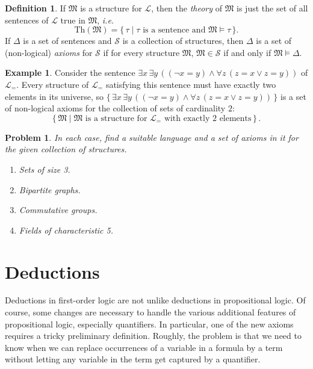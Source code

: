 \documentclass[12pt]{amsbook}
\theoremstyle{plain}
\newtheorem{prob}[thm]{Problem}
\theoremstyle{definition}
\newtheorem{defn}{Definition}[chapter]
\newtheorem{exmp}{Example}[chapter]
\theoremstyle{remark}
\begin{document}
\begin{defn} \label{d:ax}   
If $\mathfrak{M}$ is a structure for $\mathcal{L}$,  then the {\em theory\/} of $\mathfrak{M}$ is just the set of all sentences of $\mathcal{L}$ true in $\mathfrak{M}$,  {\em i.e.\/}
\[
\text{Th}(\mathfrak{M}) = \{\, \tau \mid \tau \text{\ is a sentence and\ } \mathfrak{M} \models \tau \,\}.
\]
If $\Delta$ is a set of sentences and $\mathcal{S}$ is a collection of structures,  then $\Delta$ is a set of (non-logical) {\it axioms\/} for $\mathcal{S}$ if for every structure $\mathfrak{M}$,  $\mathfrak{M} \in \mathcal{S}$ if and only if $\mathfrak{M} \models \Delta$.
\end{defn}

\begin{exmp}
Consider the sentence $\exists x\, \exists y\, ( (\lnot x = y) \land \forall z\, (z = x \lor z = y))$ of $\mathcal{L}_=$.  Every structure of $\mathcal{L}_=$ satisfying this sentence must have exactly two elements in its universe,  so $\{\, \exists x\, \exists y\, ( (\lnot x = y) \land \forall z\, (z = x \lor z = y)) \,\}$ is a set of non-logical axioms for the collection of sets of cardinality $2$:
\[
\{\, \mathfrak{M} \mid \mathfrak{M} \text{\ is a structure for\ } \mathcal{L}_= \text{\ with exactly $2$ elements} \,\} \, . 
\]
\end{exmp}

\begin{prob} \label{p:six16}
In each case,  find a suitable language and a set of axioms in it for the given collection of structures.
\begin{enumerate}
\item Sets of size 3.
\item Bipartite graphs.
\item Commutative groups.
\item Fields of characteristic 5.
\end{enumerate}
\end{prob}



%
%

\chapter{Deductions} \label{ch:seven}

Deductions in first-order logic are not unlike deductions in propositional logic.  Of course,  some changes are necessary to handle the various additional features of propositional logic,  especially quantifiers.  In particular,  one of the new axioms requires a tricky preliminary definition.  Roughly,  the problem is that we need to know when we can replace occurrences of a variable in a formula by a term without letting any variable in the term get captured by a quantifier.
\end{document}
